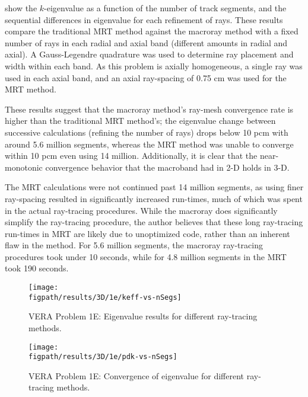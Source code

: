 {{{{         show the $k$-eigenvalue as a function of the number of track segments, and the sequential differences in eigenvalue for each refinement of rays.
        These results compare the traditional \ac{MRT} method against the macroray method with a fixed number of rays in each radial and axial band (different amounts in radial and axial).
        A Gauss-Legendre quadrature was used to determine ray placement and width within each band.
        As this problem is axially homogeneous, a single ray was used in each axial band, and an axial ray-spacing of 0.75 cm was used for the \ac{MRT} method.

        These results suggest that the macroray method's ray-mesh convergence rate is higher than the traditional \ac{MRT} method's;
          the eigenvalue change between successive calculations (refining the number of rays) drops below 10 pcm with around 5.6 million segments, whereas the \ac{MRT} method was unable to converge within 10 pcm even using 14 million.
        Additionally, it is clear that the near-monotonic convergence behavior that the macroband had in 2-D holds in 3-D.

        The \ac{MRT} calculations were not continued past 14 million segments, as using finer ray-spacing resulted in significantly increased run-times, much of which was spent in the actual ray-tracing procedures.
        While the macroray does significantly simplify the ray-tracing procedure, the author believes that these long ray-tracing run-times in \ac{MRT} are likely due to unoptimized code, rather than an inherent flaw in the method.
        For 5.6 million segments, the macroray ray-tracing procedures took under 10 seconds, while for 4.8 million segments in the \ac{MRT} took 190 seconds.

        \begin{figure}[htbp]
          \centering
          \texttt{[image: \\figpath/results/3D/1e/keff-vs-nSegs]}
          \caption{VERA Problem 1E: Eigenvalue results for different ray-tracing methods. \label{fig:MR:1e:3D:keff-vs-nSegs}}
        \end{figure}
        \begin{figure}[htbp]
          \centering
          \texttt{[image: \\figpath/results/3D/1e/pdk-vs-nSegs]}
          \caption{VERA Problem 1E: Convergence of eigenvalue for different ray-tracing methods. \label{fig:MR:1e:3D:pdf-vs-nSegs}}
        \end{figure}
      }
    }

}}
